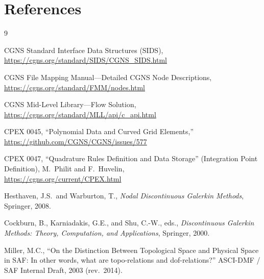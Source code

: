 \documentclass[11pt,letterpaper]{article}
\begin{document}
\section{References}

\begin{thebibliography}{9}

CGNS Standard Interface Data Structures (SIDS),\\
\url{https://cgns.org/standard/SIDS/CGNS_SIDS.html}

CGNS File Mapping Manual---Detailed CGNS Node Descriptions,\\
\url{https://cgns.org/standard/FMM/nodes.html}

CGNS Mid-Level Library---Flow Solution,\\
\url{https://cgns.org/standard/MLL/api/c_api.html}

CPEX 0045, ``Polynomial Data and Curved Grid Elements,''\\
\url{https://github.com/CGNS/CGNS/issues/577}

CPEX 0047, ``Quadrature Rules Definition and Data Storage''
(Integration Point Definition), M.~Philit and F.~Huvelin,\\
\url{https://cgns.org/current/CPEX.html}

Hesthaven, J.S.\ and Warburton, T., \emph{Nodal Discontinuous
Galerkin Methods}, Springer, 2008.

Cockburn, B., Karniadakis, G.E., and Shu, C.-W., eds.,
\emph{Discontinuous Galerkin Methods: Theory, Computation, and
Applications}, Springer, 2000.

Miller, M.C., ``On the Distinction Between Topological Space and
Physical Space in SAF: In other words, what are topo-relations and
dof-relations?'' ASCI-DMF / SAF Internal Draft, 2003 (rev.\ 2014).

\end{thebibliography}
\end{document}
